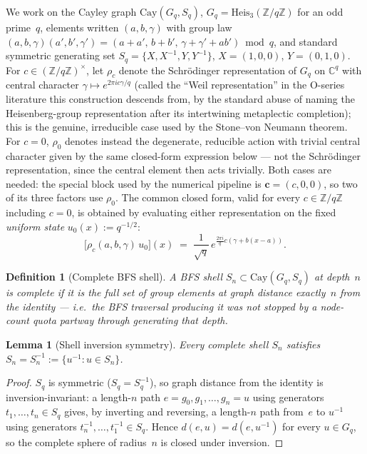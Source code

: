 \documentclass[11pt,a4paper]{article}
\newtheorem{lemma}[theorem]{Lemma}
\newtheorem{definition}[theorem]{Definition}
\begin{document}
    We work on the Cayley graph $\mathrm{Cay}(G_q, S_q)$, $G_q = \mathrm{Heis}_3(\mathbb{Z}/q\mathbb{Z})$
    for an odd prime~$q$, elements written $(a,b,\gamma)$ with group law
    $(a,b,\gamma)(a',b',\gamma') = (a+a',\, b+b',\, \gamma+\gamma'+ab') \bmod q$, and standard
    symmetric generating set $S_q = \{X, X^{-1}, Y, Y^{-1}\}$, $X=(1,0,0)$, $Y=(0,1,0)$. For
    $c \in (\mathbb{Z}/q\mathbb{Z})^\times$, let $\rho_c$ denote the Schr\"odinger representation of
    $G_q$ on $\mathbb{C}^q$ with central character $\gamma \mapsto e^{2\pi i c\gamma/q}$ (called the
    ``Weil representation'' in the O-series literature this construction descends from, by the
    standard abuse of naming the Heisenberg-group representation after its intertwining metaplectic
    completion); this is the genuine, irreducible case used by the Stone--von Neumann theorem. For
    $c=0$, $\rho_0$ denotes instead the degenerate, reducible action with trivial central character
    given by the same closed-form expression below --- not the Schr\"odinger representation, since
    the central element then acts trivially. Both cases are needed: the special block used by the
    numerical pipeline is $\mathbf c = (c,0,0)$, so two of its three factors use $\rho_0$.
    The common closed form, valid for every $c \in \mathbb{Z}/q\mathbb{Z}$ including $c=0$, is
    obtained by evaluating either representation on the fixed \emph{uniform state}
    $u_0(x) := q^{-1/2}$:
    \begin{equation}
      \label{eq:weil-matrix-element}
      \bigl[\rho_c(a,b,\gamma)\, u_0\bigr](x)
      \;=\;
      \frac{1}{\sqrt q}\,
      e^{\frac{2\pi i}{q} c \left(\gamma + b(x-a)\right)}.
    \end{equation}

    \begin{definition}[Complete BFS shell]
      \label{def:complete-shell}
      A BFS shell $S_n \subset \mathrm{Cay}(G_q,S_q)$ at depth~$n$ is \emph{complete} if it is the
      full set of group elements at graph distance exactly~$n$ from the identity --- i.e.\ the BFS
      traversal producing it was not stopped by a node-count quota partway through generating that
      depth.
    \end{definition}

    \begin{lemma}[Shell inversion symmetry]
      \label{lem:shell-inversion}
      Every complete shell $S_n$ satisfies $S_n = S_n^{-1} := \{u^{-1} : u \in S_n\}$.
    \end{lemma}
    \begin{proof}
      $S_q$ is symmetric ($S_q = S_q^{-1}$), so graph distance from the identity is
      inversion-invariant: a length-$n$ path $e = g_0, g_1, \dots, g_n = u$ using generators
      $t_1,\dots,t_n \in S_q$ gives, by inverting and reversing, a length-$n$ path from~$e$ to
      $u^{-1}$ using generators $t_n^{-1}, \dots, t_1^{-1} \in S_q$. Hence $d(e,u) = d(e,u^{-1})$
      for every $u \in G_q$, so the complete sphere of radius~$n$ is closed under inversion.
    \end{proof}
\end{document}
